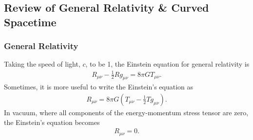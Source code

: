 \documentclass[a4paper,11pt]{article}
\numberwithin{equation}{section}
\theoremstyle{definition}
\begin{document}
\subsection{Review of General Relativity \& Curved Spacetime}

\subsubsection{General Relativity}
Taking the speed of light, $c$, to be 1, the Einstein equation for general relativity is
\begin{align}
R_{\mu\nu} - \frac{1}{2}Rg_{\mu\nu} = 8\pi GT_{\mu\nu}.
\end{align}
Sometimes, it is more useful to write the Einstein's equation as
\begin{align}
R_{\mu\nu} = 8\pi G \left( T_{\mu\nu} - \frac{1}{2}Tg_{\mu\nu} \right).
\end{align}
In vacuum, where all components of the energy-momentum stress tensor are zero, the Einstein's equation becomes
\begin{align}
R_{\mu\nu} = 0.
\end{align}
\end{document}
